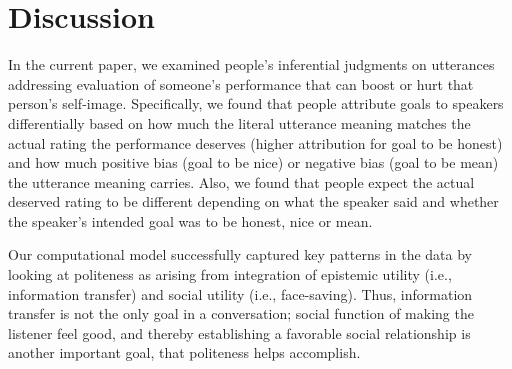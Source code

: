 \documentclass[10pt,letterpaper]{article}
\begin{document}
\section{Discussion}

In the current paper, we examined people's inferential judgments on utterances addressing evaluation of someone's performance that can boost or hurt that person's self-image. Specifically, we found that people attribute goals to speakers differentially based on how much the literal utterance meaning matches the actual rating the performance deserves (higher attribution for goal to be honest) and how much positive bias (goal to be nice) or negative bias (goal to be mean) the utterance meaning carries. Also, we found that people expect the actual deserved rating to be different depending on what the speaker said and whether the speaker's intended goal was to be honest, nice or mean. 

Our computational model successfully captured key patterns in the data by looking at politeness as arising from integration of epistemic utility (i.e., information transfer) and social utility (i.e., face-saving). Thus, information transfer is not the only goal in a conversation; social function of making the listener feel good, and thereby establishing a favorable social relationship is another important goal, that politeness helps accomplish.




\setlength{\bibleftmargin}{.125in}
\setlength{\bibindent}{-\bibleftmargin}


\end{document}
